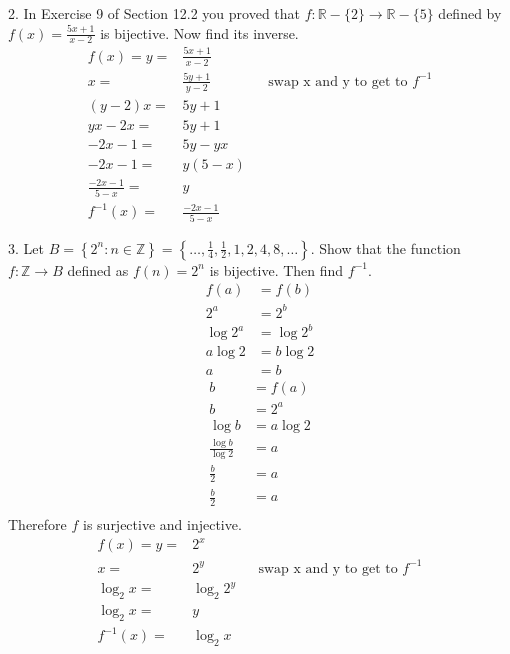 \documentclass{article}
\begin{document}
\begin{exercise}{}{}
	{2. In Exercise 9 of Section 12.2 you proved that $f:
			\mathbb{R}-\{2\} \rightarrow \mathbb{R}-\{5\}$ defined by $f(x)=\frac{5
				x+1}{x-2}$ is bijective. Now find its inverse.}
	\begin{align*}
		f(x)=y=            & \frac{5 x+1}{x-2}                                           \\
		x=                 & \frac{5y+1}{y-2}  &  & \text{swap x and y to get to }f^{-1} \\
		(y-2)x=            & 5y+1                                                        \\
		yx-2x=             & 5y+1                                                        \\
		-2x-1=             & 5y-yx                                                       \\
		-2x-1=             & y(5-x)                                                      \\
		\frac{-2x-1}{5-x}= & y                                                           \\
		f^{-1}(x) =        & \frac{-2x-1}{5-x}
	\end{align*}
\end{exercise}{}{}

\begin{exercise}{}{}
	{3. Let $B=\left\{2^n: n \in \mathbb{Z}\right\}=\left\{\ldots,
			\frac{1}{4}, \frac{1}{2}, 1,2,4,8, \ldots\right\}$. Show that the function
		$f: \mathbb{Z} \rightarrow B$ defined as $f(n)=2^n$ is bijective. Then find
		$f^{-1}$.}
	\begin{align*}
		f(a)     & =f(b)     \\
		2^a      & =2^b      \\
		\log 2^a & =\log 2^b \\
		a \log 2 & =b \log 2 \\
		a        & =b
	\end{align*}
	\begin{align*}
		b                     & =f(a)     \\
		b                     & =2^a      \\
		\log b                & =a \log 2 \\
		\frac{\log b}{\log 2} & = a       \\
		\frac{b}{2}           & = a       \\
		\frac{b}{2}           & = a       \\
	\end{align*}
	Therefore $f$ is surjective and injective.
	\begin{align*}
		f(x)=y=     & 2^x                                                  \\
		x=          & 2^y        &  & \text{swap x and y to get to }f^{-1} \\
		\log_2 x=   & \log_2 2^y                                           \\
		\log_2 x=   & y                                                    \\
		f^{-1}(x) = & \log_2 x
	\end{align*}
\end{exercise}{}{}
\end{document}
